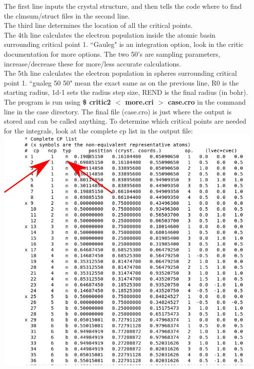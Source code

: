 \documentclass[12pt]{article}
\begin{document}
The first line inputs the crystal structure, and then tells the code where to find the clmsum/struct files in the second line.  \\

The third line determines the location of all the critical points.  \\

The 4th line calculates the electron population inside the atomic basin surrounding critical point 1.  ``Gauleg" is an integration option, look in the critic documentation for more options.  The two 50's are sampling parameters, increase/decrease these for more/less accurate calculations.  \\

The 5th line calculates the electron population in spheres surrounding critical point 1. ``gualeg 50 50" mean the exact same as on the previous line, R0 is the starting radius, 1d-1 sets the radius step size, REND is the final radius (in bohr).\\

The program is run using \textbf{\$ critic2 $<$ more.cri $>$ case.cro} in the command line in the case directory.  The final file (case.cro) is just where the output is stored and can be called anything.  To determine which critical points are needed for the integrals, look at the complete cp list in the output file: \\

\includegraphics[scale=0.4]{./images/cro_cplist.png}\\
\end{document}
